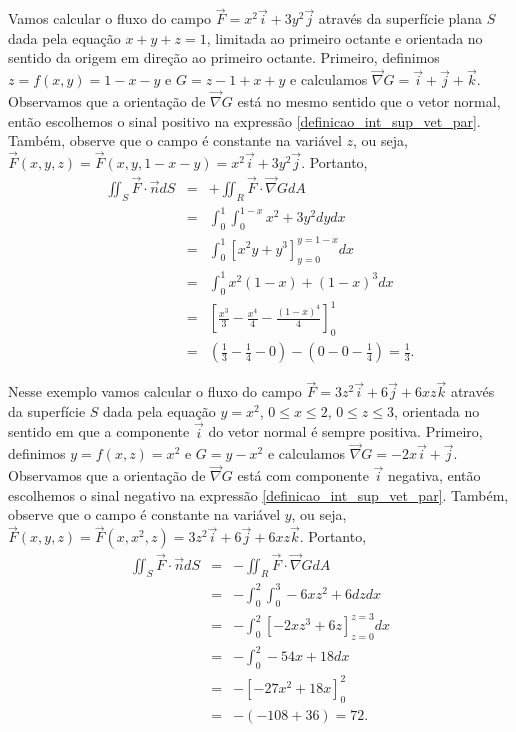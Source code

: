 \begin{ex}Vamos calcular o fluxo do campo $\vec{F}=x^2\vec{i}+3y^2\vec{j}$ através da superfície plana $S$ dada pela equação $x+y+z=1$, limitada ao primeiro octante e orientada no sentido da origem em direção ao primeiro octante. Primeiro, definimos $z=f(x,y)=1-x-y$ e $G=z-1+x+y$ e calculamos $\vec{\nabla}G=\vec{i}+\vec{j}+\vec{k}$. Observamos que a orientação de $\vec{\nabla}G$ está no mesmo sentido que o vetor normal, então escolhemos o sinal positivo na expressão \eqref{definicao_int_sup_vet_par}. Também, observe que o campo é constante na variável $z$, ou seja, $\vec{F}(x,y,z)=\vec{F}(x,y,1-x-y)=x^2\vec{i}+3y^2\vec{j}$. Portanto,
\begin{eqnarray*}
\iint_S \vec{F}\cdot \vec{n} d S&=& + \iint_R \vec{F}\cdot \vec{\nabla}G dA\\
&=&  \int_0^1\int_0^{1-x} x^2+3y^2 dydx\\
&=&  \int_0^1  \left[x^2y+y^3\right]_{y=0}^{y=1-x} dx\\
&=&  \int_0^1  x^2(1-x)+(1-x)^3 dx\\
&=&  \left[  \frac{x^3}{3}-\frac{x^4}{4}-\frac{(1-x)^4}{4} \right]_0^1\\
&=&  \left(  \frac{1}{3}-\frac{1}{4}-0\right)-\left(0-0-\frac{1}{4}\right)=\frac{1}{3}.
\end{eqnarray*}
\end{ex}

\begin{ex}Nesse exemplo vamos calcular o fluxo do campo $\vec{F}=3z^2\vec{i}+6\vec{j}+6xz\vec{k}$ através da superfície $S$ dada pela equação $y=x^2$, $0\leq x\leq 2$, $0\leq z\leq 3$, orientada no sentido em que a componente $\vec{i}$ do vetor normal é sempre positiva. Primeiro, definimos $y=f(x,z)=x^2$ e $G=y-x^2$ e calculamos $\vec{\nabla}G=-2x\vec{i}+\vec{j}$. Observamos que a orientação de $\vec{\nabla}G$ está com componente $\vec{i}$ negativa, então escolhemos o sinal negativo na expressão \eqref{definicao_int_sup_vet_par}. Também, observe que o campo é constante na variável $y$, ou seja, $\vec{F}(x,y,z)=\vec{F}(x,x^2,z)=3z^2\vec{i}+6\vec{j}+6xz\vec{k}$. Portanto,
\begin{eqnarray*}
\iint_S \vec{F}\cdot \vec{n} d S&=& - \iint_R \vec{F}\cdot \vec{\nabla}G dA\\
&=&  -\int_0^2\int_0^{3} -6xz^2+6 dzdx\\
&=&  -\int_0^2\left[ -2xz^3+6z\right]_{z=0}^{z=3} dx\\
&=&  -\int_0^2 -54x+18 dx\\
&=&  -\left[ -27x^2+18x\right]_0^2\\
&=&  -\left( -108+36\right)=72.
\end{eqnarray*}
\end{ex}

